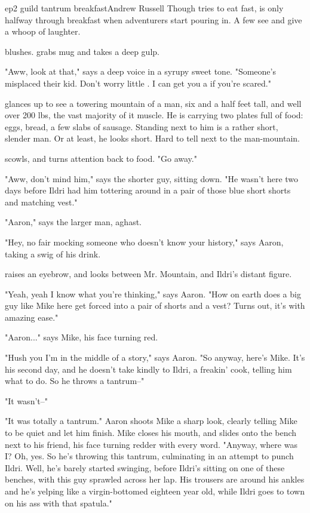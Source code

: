 \documentclass{book}
\begin{document}
\begin{childnode}{ep2 guild tantrum breakfast}{Andrew Russell}
    Though \name{} tries to eat fast, \heshe{} is only halfway through \hisher{} breakfast when adventurers start pouring in. A few see \himher{} and give a whoop of laughter.

    \name{} blushes. \HeShe{} grabs \hisher{} mug and takes a deep gulp. 

    "Aww, look at that," says a deep voice in a syrupy sweet tone. "Someone's misplaced their kid. Don't worry little . I can get you a  if you're scared."

    \name{} glances up to see a towering mountain of a man, six and a half feet tall, and well over 200 lbs, the vast majority of it muscle. He is carrying two plates full of food: eggs, bread, a 
    few slabs of sausage. Standing next to him is a rather short, slender
    man. Or at least, he looks short. Hard to tell next to the man-mountain.

    \name{} scowls, and turns \hisher{} attention back to \hisher{} food. "Go away."

    "Aww, don't mind him," says the shorter guy, sitting down. "He wasn't here two days before Ildri had him tottering around in a pair of those blue short shorts and matching vest."

    "Aaron," says the larger man, aghast.

    "Hey, no fair mocking someone who doesn't know your history," says Aaron, taking a swig of his drink.

    \name{} raises an eyebrow, and looks between Mr. Mountain, and Ildri's distant figure. 

    "Yeah, yeah I know what you're thinking," says Aaron. "How on earth does a big guy like Mike here get forced into a pair of shorts and a vest? Turns out, it's with amazing ease."

    "Aaron..." says Mike, his face turning red.

    "Hush you I'm in the middle of a story," says Aaron. "So anyway, here's Mike. It's his second day, and he doesn't take kindly to Ildri, a freakin' cook, telling him what to do. So he throws a tantrum--"

    "It wasn't--"

    "It was totally a tantrum." Aaron shoots Mike a sharp look, clearly telling Mike to be quiet and let him finish. Mike closes his mouth, and slides onto the bench next to his friend, his face turning redder with every word. "Anyway, where was I? Oh,
    yes. So he's throwing this tantrum, culminating in an attempt to punch Ildri. Well, he's barely started swinging, before Ildri's sitting on one of these benches, with this guy sprawled across her lap. His trousers are around his ankles and he's yelping like
    a virgin-bottomed eighteen year old, while Ildri goes to town on his ass with that spatula."


\end{childnode}
\end{document}
